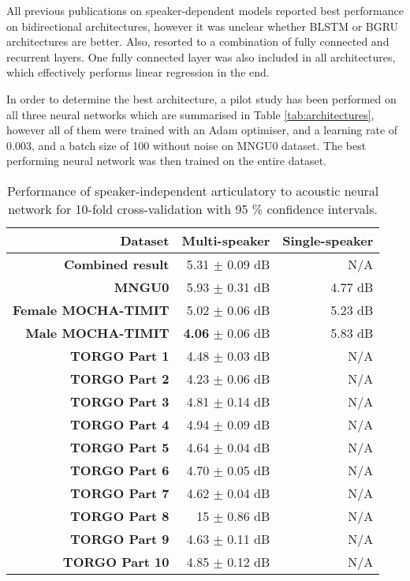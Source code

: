 \documentclass[a4paper]{article}
\begin{document}
All previous publications on speaker-dependent models reported best
performance on bidirectional architectures, however it was unclear whether
BLSTM or BGRU architectures are better. Also, \cite{Taguchi} resorted to
a combination of fully connected and recurrent layers. One fully connected layer
was also included in all architectures, which effectively performs linear
regression in the end.

In order to determine the best architecture, a pilot study has been
performed on all three neural networks which are summarised in Table \ref{tab:architectures},
however all of them were trained with an Adam optimiser, and a learning rate
of \( 0.003 \), and a batch size of 100 without noise on MNGU0 dataset.
The best performing neural network was then trained on the entire dataset. 


\begin{table}[th]
  \caption{Performance of speaker-independent articulatory to acoustic neural network for 10-fold cross-validation with 95 \% confidence intervals.}
  \label{tab:all_data}
  \centering
  \footnotesize

  \begin{tabular}{ r r r }
    \toprule
    \textbf{Dataset} & Multi-speaker & Single-speaker \\
    \midrule
    \textbf{Combined result} & 5.31 $\pm$ 0.09 dB & N/A \\  
    \midrule
    \textbf{MNGU0} & 5.93 $\pm$ 0.31 dB & 4.77 dB \\
    \textbf{Female MOCHA-TIMIT} & 5.02 $\pm$ 0.06 dB  & 5.23 dB \\
    \textbf{Male MOCHA-TIMIT} & \textbf{4.06} $\pm$ 0.06 dB & 5.83 dB \\
    \textbf{TORGO Part 1} & 4.48 $\pm$ 0.03 dB & N/A \\
    \textbf{TORGO Part 2} & 4.23 $\pm$ 0.06 dB & N/A \\
    \textbf{TORGO Part 3} & 4.81 $\pm$ 0.14 dB & N/A \\
    \textbf{TORGO Part 4} & 4.94 $\pm$ 0.09 dB & N/A \\
    \textbf{TORGO Part 5} & 4.64 $\pm$ 0.04 dB & N/A \\
    \textbf{TORGO Part 6} & 4.70 $\pm$ 0.05 dB & N/A \\
    \textbf{TORGO Part 7} & 4.62 $\pm$ 0.04 dB & N/A \\
    \textbf{TORGO Part 8} & 15 $\pm$ 0.86 dB & N/A\\
    \textbf{TORGO Part 9} & 4.63 $\pm$ 0.11 dB & N/A \\
    \textbf{TORGO Part 10} & 4.85 $\pm$ 0.12 dB & N/A \\
    \bottomrule
  \end{tabular}
\end{table}
\end{document}
